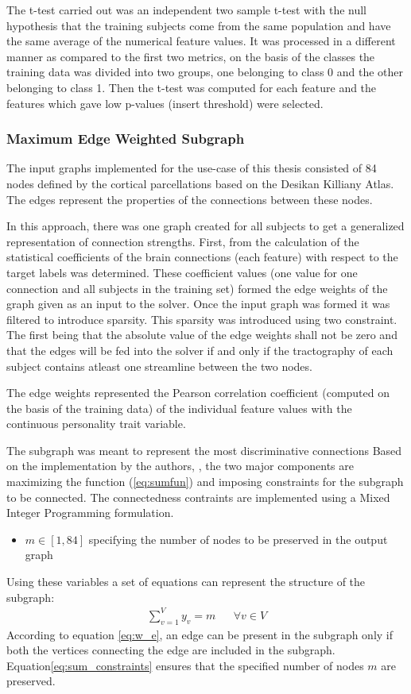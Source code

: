 \documentclass[msthesis.tex]{subfiles}
\begin{document}
The t-test carried out was an independent two sample t-test with the null hypothesis that the training subjects come from the same population and have the same average of the numerical feature values. It was processed in a different manner as compared to the first two metrics, on the basis of the classes the training data was divided into two groups, one belonging to class 0 and the other belonging to class 1. Then the t-test was computed for each feature and the features which gave low p-values (insert threshold) were selected. 
\subsubsection{Maximum Edge Weighted Subgraph}
The input graphs implemented for the use-case of this thesis consisted of 84 nodes defined by the cortical parcellations based on the Desikan Killiany Atlas. The edges represent the properties of the connections between these nodes. 

In this approach, there was one graph created for all subjects to get a generalized representation of connection strengths. First, from the calculation of the statistical coefficients of the brain connections (each feature) with respect to the target labels was determined. These coefficient values (one value for one connection and all subjects in the training set) formed the edge weights of the graph given as an input to the solver. Once the input graph was formed it was filtered to introduce sparsity. This sparsity was introduced using two constraint. The first being that the absolute value of the edge weights shall not be zero and that the edges will be fed into the solver if and only if the tractography of each subject contains atleast one streamline between the two nodes. 

The edge weights represented the Pearson correlation coefficient (computed on the basis of the training data) of the individual feature values with the continuous personality trait variable. 

The subgraph was meant to represent the most discriminative connections  Based on the implementation by the authors, \cite{DBLP:journals/corr/LobodaAS16}, the two major components are maximizing the function (\ref{eq:sumfun}) and imposing constraints for the subgraph to be connected. The connectedness contraints are implemented using a Mixed Integer Programming formulation. 

\begin{itemize}
 \item $m \in [1,84]$ specifying the number of nodes to be preserved in the output graph
\end{itemize}
Using these variables a set of equations can represent the structure of the subgraph:
\begin{align}
    \label{eq:sum_constraints}
    \sum_{v=1}^{V} y_v = m        &&  \forall v \in V
\end{align}
According to  equation \ref{eq:w_e}, an edge can be present in the subgraph only if both the vertices connecting the edge are included in the subgraph. Equation\ref{eq:sum_constraints} ensures that the specified number of nodes $m$ are preserved. 
\end{document}
